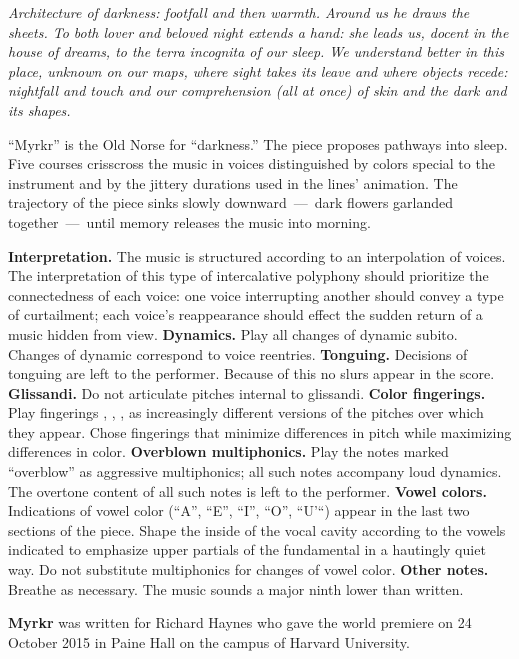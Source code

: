 \documentclass[10pt]{article}
\begin{document}
\textit{Architecture of darkness: footfall and then warmth. Around us he draws
the sheets. To both lover and beloved night extends a hand: she leads us,
docent in the house of dreams, to the terra incognita of our sleep. We
understand better in this place, unknown on our maps, where sight takes its
leave and where objects recede: nightfall and touch and our comprehension (all
at once) of skin and the dark and its shapes.}

``Myrkr'' is the Old Norse for ``darkness.'' The piece proposes pathways into
sleep. Five courses crisscross the music in voices distinguished by colors
special to the instrument and by the jittery durations used in the lines'
animation. The trajectory of the piece sinks slowly downward~---~dark flowers
garlanded together~---~until memory releases the music into morning.

\textbf{Interpretation.} The music is structured according to an interpolation
of voices. The interpretation of this type of intercalative polyphony should
prioritize the connectedness of each voice: one voice interrupting another
should convey a type of curtailment; each voice's reappearance should effect
the sudden return of a music hidden from view. \textbf{Dynamics.} Play all
changes of dynamic subito. Changes of dynamic correspond to voice reentries.
\textbf{Tonguing.} Decisions of tonguing are left to the performer. Because of
this no slurs appear in the score. \textbf{Glissandi.} Do not articulate
pitches internal to glissandi. \textbf{Color fingerings.} Play fingerings
, , ,  as increasingly different
versions of the pitches over which they appear. Chose fingerings that minimize
differences in pitch while maximizing differences in color. \textbf{Overblown
multiphonics.} Play the notes marked ``overblow'' as aggressive multiphonics;
all such notes accompany loud dynamics. The overtone content of all such notes
is left to the performer. \textbf{Vowel colors.} Indications of vowel color
(``A'', ``E'', ``I'', ``O'', ``U'``) appear in the last two sections of the
piece. Shape the inside of the vocal cavity according to the vowels indicated
to emphasize upper partials of the fundamental in a hautingly quiet way. Do not
substitute multiphonics for changes of vowel color. \textbf{Other notes.}
Breathe as necessary. The music sounds a major ninth lower than written.

\textbf{Myrkr} was written for Richard Haynes who gave the world premiere on 24
October 2015 in Paine Hall on the campus of Harvard University.
\end{document}
